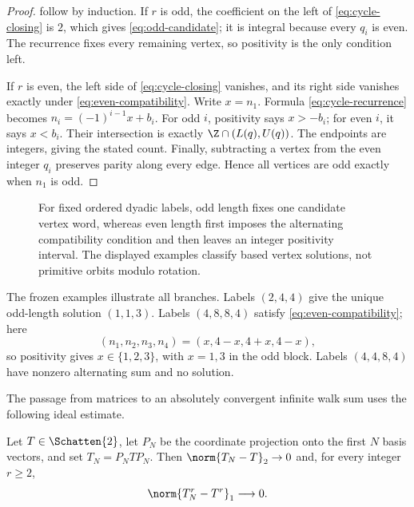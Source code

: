\begin{proof}
 follow by induction.  If $r$ is
odd, the coefficient on the left of \cref{eq:cycle-closing} is $2$, which
gives \cref{eq:odd-candidate}; it is integral because every $q_i$ is even.
The recurrence fixes every remaining vertex, so positivity is the only
condition left.

If $r$ is even, the left side of \cref{eq:cycle-closing} vanishes, and its
right side vanishes exactly under \cref{eq:even-compatibility}.  Write
$x=n_1$.  Formula \cref{eq:cycle-recurrence} becomes
$n_i=(-1)^{i-1}x+b_i$.  For odd $i$, positivity says $x>-b_i$; for even
$i$, it says $x<b_i$.  Their intersection is exactly
$\Z\cap(L(q),U(q))$.  The endpoints are integers, giving the stated count.
Finally, subtracting a vertex from the even integer $q_i$ preserves parity
along every edge.  Hence all vertices are odd exactly when $n_1$ is odd.
\end{proof}

\begin{figure}[t]
  \centering
  \resizebox{0.88\textwidth}{!}{}
  \caption{For fixed ordered dyadic labels, odd length fixes one candidate
  vertex word, whereas even length first imposes the alternating
  compatibility condition and then leaves an integer positivity interval.
  The displayed examples classify based vertex solutions, not primitive
  orbits modulo rotation.}
  \label{fig:cycle-solver-main}
\end{figure}

The frozen examples illustrate all branches.  Labels $(2,4,4)$ give the
unique odd-length solution $(1,1,3)$.  Labels $(4,8,8,4)$ satisfy
\cref{eq:even-compatibility}; here
\[
  (n_1,n_2,n_3,n_4)=(x,4-x,4+x,4-x),
\]
so positivity gives $x\in\{1,2,3\}$, with $x=1,3$ in the odd block.  Labels
$(4,4,8,4)$ have nonzero alternating sum and no solution.

The passage from matrices to an absolutely convergent infinite walk sum uses
the following ideal estimate.

\begin{lemma}
\label{lem:compression-powers}
Let $T\in\Schatten{2}$, let $P_N$ be the coordinate projection onto the
first $N$ basis vectors, and set $T_N=P_NTP_N$.  Then
$\norm{T_N-T}_2\to0$ and, for every integer $r\ge2$,
\begin{equation}
  \norm{T_N^r-T^r}_1\longrightarrow0.
  \label{eq:compression-power-convergence}
\end{equation}
\end{lemma}

